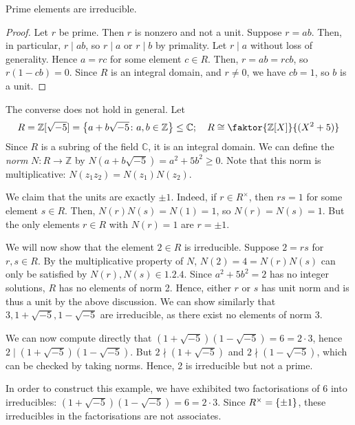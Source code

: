 \begin{lemma}
    Prime elements are irreducible.
\end{lemma}
\begin{proof}
    Let \( r \) be prime.
    Then \( r \) is nonzero and not a unit.
    Suppose \( r = ab \).
    Then, in particular, \( r \mid ab \), so \( r \mid a \) or \( r \mid b \) by primality.
    Let \( r \mid a \) without loss of generality.
    Hence \( a = rc \) for some element \( c \in R \).
    Then, \( r = ab = rcb \), so \( r(1-cb) = 0 \).
    Since \( R \) is an integral domain, and \( r \neq 0 \), we have \( cb = 1 \), so \( b \) is a unit.
\end{proof}
\begin{example}
    The converse does not hold in general.
    Let
    \[ R = \mathbb Z[\sqrt{-5}] = \qty{a+b\sqrt{-5} \colon a,b \in \mathbb Z} \leq \mathbb C;\quad R \cong \faktor{\mathbb Z[X]}{(X^2 + 5)} \]
    Since \( R \) is a subring of the field \( \mathbb C \), it is an integral domain.
    We can define the \textit{norm} \( N \colon R \to \mathbb Z \) by \( N(a+b\sqrt{-5}) = a^2 + 5b^2 \geq 0 \).
    Note that this norm is multiplicative: \( N(z_1 z_2) = N(z_1) N(z_2) \).

    We claim that the units are exactly \( \pm 1 \).
    Indeed, if \( r \in R^\times \), then \( rs = 1 \) for some element \( s \in R \).
    Then, \( N(r) N(s) = N(1) = 1 \), so \( N(r) = N(s) = 1 \).
    But the only elements \( r \in R \) with \( N(r) = 1 \) are \( r = \pm 1 \).

    We will now show that the element \( 2 \in R \) is irreducible.
    Suppose \( 2 = rs \) for \( r,s \in R \).
    By the multiplicative property of \( N \), \( N(2) = 4 = N(r) N(s) \) can only be satisfied by \( N(r), N(s) \in \qty{1,2,4} \).
    Since \( a^2 + 5b^2 = 2 \) has no integer solutions, \( R \) has no elements of norm 2.
    Hence, either \( r \) or \( s \) has unit norm and is thus a unit by the above discussion.
    We can show similarly that \( 3, 1 + \sqrt{-5}, 1 - \sqrt{-5} \) are irreducible, as there exist no elements of norm 3.

    We can now compute directly that \( (1 + \sqrt{-5})(1-\sqrt{-5}) = 6 = 2 \cdot 3 \), hence \( 2 \mid (1 + \sqrt{-5})(1-\sqrt{-5}) \).
    But \( 2 \nmid (1 + \sqrt{-5}) \) and \( 2 \nmid (1 - \sqrt{-5}) \), which can be checked by taking norms.
    Hence, 2 is irreducible but not a prime.

    In order to construct this example, we have exhibited two factorisations of 6 into irreducibles: \( (1 + \sqrt{-5})(1-\sqrt{-5}) = 6 = 2 \cdot 3 \).
    Since \( R^\times = \qty{\pm 1} \), these irreducibles in the factorisations are not associates.
\end{example}

